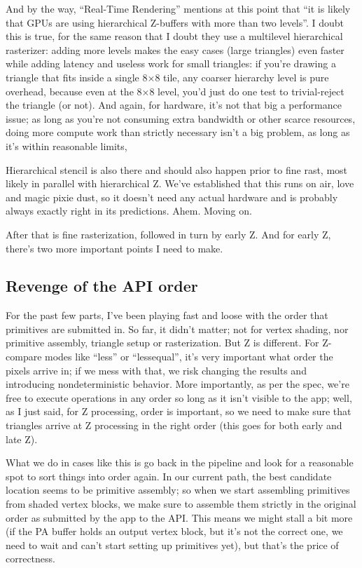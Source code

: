 \documentclass[12pt]{article}
\begin{document}
And by the way, “Real-Time Rendering” mentions at this point that “it is likely that GPUs are using hierarchical Z-buffers with more than two levels”. I doubt this is true, for the same reason that I doubt they use a multilevel hierarchical rasterizer: adding more levels makes the easy cases (large triangles) even faster while adding latency and useless work for small triangles: if you’re drawing a triangle that fits inside a single 8×8 tile, any coarser hierarchy level is pure overhead, because even at the 8×8 level, you’d just do one test to trivial-reject the triangle (or not). And again, for hardware, it’s not that big a performance issue; as long as you’re not consuming extra bandwidth or other scarce resources, doing more compute work than strictly necessary isn’t a big problem, as long as it’s within reasonable limits,

Hierarchical stencil is also there and should also happen prior to fine rast, most likely in parallel with hierarchical Z. We’ve established that this runs on air, love and magic pixie dust, so it doesn’t need any actual hardware and is probably always exactly right in its predictions. Ahem. Moving on.

After that is fine rasterization, followed in turn by early Z. And for early Z, there’s two more important points I need to make.

\subsection{Revenge of the API order}
\label{sec:org6553bc8}

For the past few parts, I’ve been playing fast and loose with the order that primitives are submitted in. So far, it didn’t matter; not for vertex shading, nor primitive assembly, triangle setup or rasterization. But Z is different. For Z-compare modes like “less” or “lessequal”, it’s very important what order the pixels arrive in; if we mess with that, we risk changing the results and introducing nondeterministic behavior. More importantly, as per the spec, we’re free to execute operations in any order so long as it isn’t visible to the app; well, as I just said, for Z processing, order is important, so we need to make sure that triangles arrive at Z processing in the right order (this goes for both early and late Z).

What we do in cases like this is go back in the pipeline and look for a reasonable spot to sort things into order again. In our current path, the best candidate location seems to be primitive assembly; so when we start assembling primitives from shaded vertex blocks, we make sure to assemble them strictly in the original order as submitted by the app to the API. This means we might stall a bit more (if the PA buffer holds an output vertex block, but it’s not the correct one, we need to wait and can’t start setting up primitives yet), but that’s the price of correctness.
\end{document}
